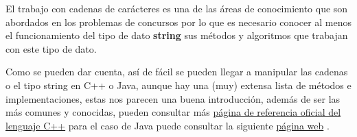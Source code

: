 El trabajo con cadenas de carácteres es una de las áreas de conocimiento que son abordados en los problemas de concursos por lo que es necesario conocer al menos el funcionamiento del tipo de dato \textbf{string} sus métodos y algoritmos que trabajan con este tipo de dato.

Como se pueden dar cuenta, así de fácil se pueden llegar a manipular las cadenas o el tipo string en C++ o Java, aunque hay una (muy) extensa lista de métodos e implementaciones, estas nos parecen una buena introducción, además de ser las más comunes y conocidas, pueden consultar más \href{http://www.cplusplus.com/reference/string/string/}{página de referencia oficial del lenguaje C++} para el caso de Java puede consultar la siguiente \href{https://www.w3schools.com/java/java_ref_string.asp}{página web}  . 